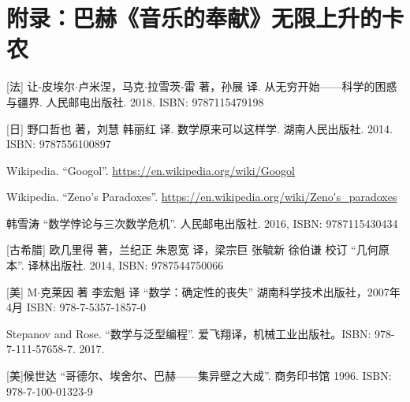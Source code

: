 \documentclass{article}
\begin{document}

\section{附录：巴赫《音乐的奉献》无限上升的卡农}



\ifx\wholebook\relax \else
\begin{thebibliography}{99}

[法] 让-皮埃尔$\cdot$卢米涅，马克$\cdot$拉雪茨-雷 著，孙展 译. 从无穷开始——科学的困惑与疆界. 人民邮电出版社. 2018. ISBN: 9787115479198

[日] 野口哲也 著，刘慧 韩丽红 译. 数学原来可以这样学. 湖南人民出版社. 2014. ISBN: 9787556100897

Wikipedia. ``Googol''. \url{https://en.wikipedia.org/wiki/Googol}

Wikipedia. ``Zeno's Paradoxes''. \url{https://en.wikipedia.org/wiki/Zeno's_paradoxes}

韩雪涛 ``数学悖论与三次数学危机''. 人民邮电出版社. 2016, ISBN: 9787115430434

[古希腊] 欧几里得 著，兰纪正 朱恩宽 译，梁宗巨 张毓新 徐伯谦 校订 ``几何原本''. 译林出版社. 2014, ISBN: 9787544750066

[美] M$\cdot$克莱因 著 李宏魁 译 ``数学：确定性的丧失'' 湖南科学技术出版社，2007年4月 ISBN: 978-7-5357-1857-0

Stepanov and Rose. ``数学与泛型编程''. 爱飞翔译，机械工业出版社。ISBN: 978-7-111-57658-7. 2017.

[美]候世达 ``哥德尔、埃舍尔、巴赫——集异壁之大成''. 商务印书馆 1996. ISBN: 978-7-100-01323-9

\end{thebibliography}

\expandafter\enddocument

\fi
\end{document}
